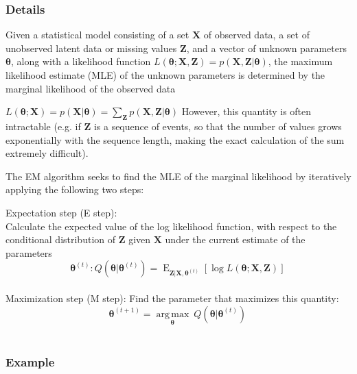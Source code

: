 \documentclass[12pt]{book}
\begin{document}
\subsubsection{Details}
Given a statistical model consisting of a set $\mathbf{X}$ of observed data, a set of unobserved latent data or missing values $\mathbf{Z}$, and a vector of unknown parameters $\boldsymbol\theta$, 
along with a likelihood function $L(\boldsymbol\theta; \mathbf{X}, \mathbf{Z}) = p(\mathbf{X}, \mathbf{Z}|\boldsymbol\theta)$, the maximum likelihood estimate (MLE) of the unknown parameters is 
determined by the marginal likelihood of the observed data

$L(\boldsymbol\theta; \mathbf{X}) = p(\mathbf{X}|\boldsymbol\theta) = \sum_{\mathbf{Z}} p(\mathbf{X},\mathbf{Z}|\boldsymbol\theta)$ 
However, this quantity is often intractable (e.g. if $\mathbf{Z}$ is a sequence of events, so that the number of values grows exponentially with the sequence length, making the exact calculation of 
the sum extremely difficult).

The EM algorithm seeks to find the MLE of the marginal likelihood by iteratively applying the following two steps:

Expectation step (E step): \\
Calculate the expected value of the log likelihood function, with respect to the conditional distribution of $\mathbf{Z}$ given $\mathbf{X}$ under the current estimate of the parameters \\
$$\boldsymbol\theta^{(t)}: Q(\boldsymbol\theta|\boldsymbol\theta^{(t)}) = \operatorname{E}_{\mathbf{Z}|\mathbf{X},\boldsymbol\theta^{(t)}}\left[ \log L (\boldsymbol\theta;\mathbf{X},\mathbf{Z})  \right] \,$$ \\
Maximization step (M step): Find the parameter that maximizes this quantity:\\
$$\boldsymbol\theta^{(t+1)} = \underset{\boldsymbol\theta}{\operatorname{arg\,max}} \ Q(\boldsymbol\theta|\boldsymbol\theta^{(t)}) \,$$\\

\subsubsection{Example}
\end{document}
